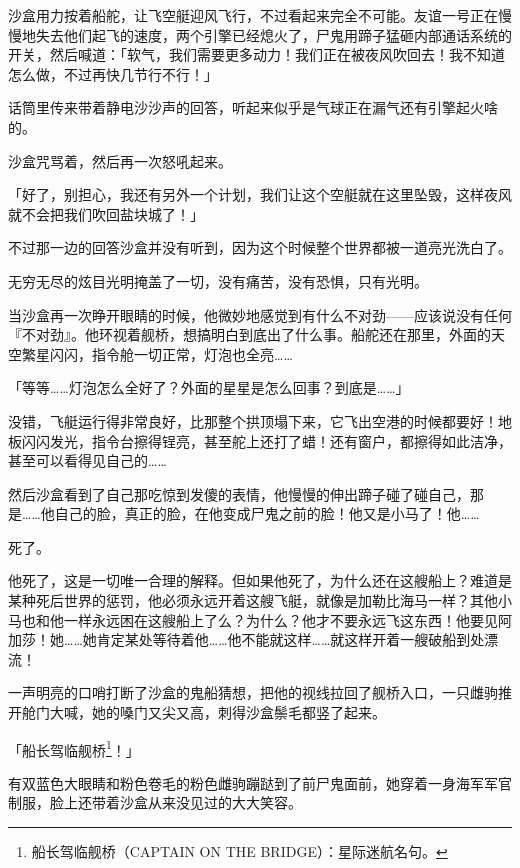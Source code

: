 \horizonline


沙盒用力按着船舵，让飞空艇迎风飞行，不过看起来完全不可能。友谊一号正在慢慢地失去他们起飞的速度，两个引擎已经熄火了，尸鬼用蹄子猛砸内部通话系统的开关，然后喊道：「软气，我们需要更多动力！我们正在被夜风吹回去！我不知道怎么做，不过再快几节行不行！」

话筒里传来带着静电沙沙声的回答，听起来似乎是气球正在漏气还有引擎起火啥的。

沙盒咒骂着，然后再一次怒吼起来。

「好了，别担心，我还有另外一个计划，我们让这个空艇就在这里坠毁，这样夜风就不会把我们吹回盐块城了！」

不过那一边的回答沙盒并没有听到，因为这个时候整个世界都被一道亮光洗白了。

无穷无尽的炫目光明掩盖了一切，没有痛苦，没有恐惧，只有光明。

\horizonline

\unknowndaytimeplace

当沙盒再一次睁开眼睛的时候，他微妙地感觉到有什么不对劲——应该说没有任何『不对劲』。他环视着舰桥，想搞明白到底出了什么事。船舵还在那里，外面的天空繁星闪闪，指令舱一切正常，灯泡也全亮……{}

「等等……灯泡怎么全好了？外面的星星是怎么回事？到底是……」

没错，飞艇运行得非常良好，比那整个拱顶塌下来，它飞出空港的时候都要好！地板闪闪发光，指令台擦得锃亮，甚至舵上还打了蜡！还有窗户，都擦得如此洁净，甚至可以看得见自己的……{}

然后沙盒看到了自己那吃惊到发傻的表情，他慢慢的伸出蹄子碰了碰自己，那是……他自己的脸，真正的脸，在他变成尸鬼之前的脸！他又是小马了！他……{}

死了。

他死了，这是一切唯一合理的解释。但如果他死了，为什么还在这艘船上？难道是某种死后世界的惩罚，他必须永远开着这艘飞艇，就像是加勒比海马一样？其他小马也和他一样永远困在这艘船上了么？为什么？他才不要永远飞这东西！他要见阿加莎！她……她肯定某处等待着他……他不能就这样……就这样开着一艘破船到处漂流！

一声明亮的口哨打断了沙盒的鬼船猜想，把他的视线拉回了舰桥入口，一只雌驹推开舱门大喊，她的嗓门又尖又高，刺得沙盒鬃毛都竖了起来。

「船长驾临舰桥\footnote{船长驾临舰桥（CAPTAIN ON THE BRIDGE）：星际迷航名句。}！」

有双蓝色大眼睛和粉色卷毛的粉色雌驹蹦跶到了前尸鬼面前，她穿着一身海军军官制服，脸上还带着沙盒从来没见过的大大笑容。

